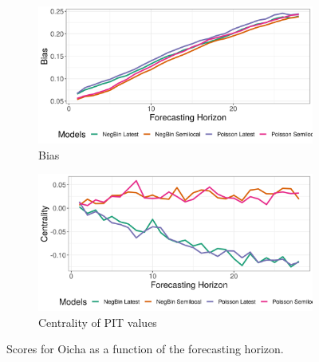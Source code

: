 \begin{figure}[H]
\begin{subfigure}{0.5\textwidth}
  \centering
  \includegraphics[width=\linewidth]{../output/Oicha_bias.png}  
  \caption{Bias}
  \label{fig:Oicha_scores_3}
\end{subfigure}
\begin{subfigure}{0.5\textwidth}
  \centering
  \includegraphics[width=\linewidth]{../output/Oicha_centrality.png}  
  \caption{Centrality of PIT values}
  \label{fig:Oicha_scores_4}
\end{subfigure}
  \caption{Scores for Oicha as a function of the forecasting horizon.}

  \label{fig:nat_scores}
\end{figure}
